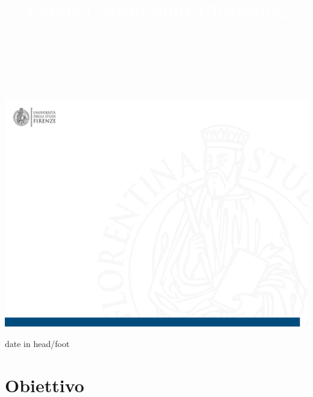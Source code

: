 \title{\textcolor{White}{Parallel Mean Shift Clustering}}  
\author{\textcolor{White}{Nicol\ao Pollini, Francesco Fantechi}}
\date{\textcolor{White}{22/06/2023}}
 

 
\frame{\titlepage} 


{\includegraphics[width=\paperwidth,height=\paperheight,keepaspectratio]{Immagine2}}





 
 
 
 
 
 
 
 {
 	\begin{beamercolorbox}[ht=1ex,sep=1ex, center]{date in head/foot}
 		\insertshorttitle \ \ \hspace{2cm}  \insertsection  \ \ \ \insertsubsection \hfill\insertframenumber%
 	\end{beamercolorbox}
 	
 }
 
 

\section{Obiettivo}
 
